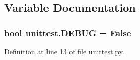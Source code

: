 \subsection{Variable Documentation}
\subsubsection[{\texorpdfstring{D\+E\+B\+UG}{DEBUG}}]{\setlength{\rightskip}{0pt plus 5cm}bool unittest.\+D\+E\+B\+UG = False}\hypertarget{namespaceunittest_a6f95c254ae4668ea73efe6cf7ca3c36d}{}\label{namespaceunittest_a6f95c254ae4668ea73efe6cf7ca3c36d}


Definition at line 13 of file unittest.\+py.

